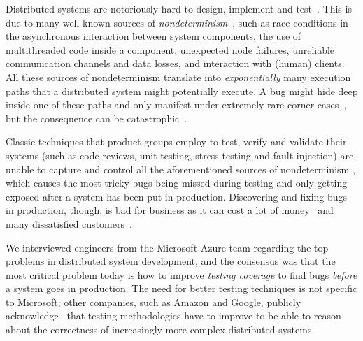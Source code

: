 Distributed systems are notoriously hard to design, implement and test~\cite{cavage2013there, laguna2015debugging, maddox2015test}. This is due to many well-known sources of \emph{nondeterminism}~\cite{chandra2007paxos}, such as race conditions in the asynchronous interaction between system components, the use of multithreaded code inside a component, unexpected node failures, unreliable communication channels and data losses, and interaction with (human) clients.
%
All these sources of nondeterminism translate into \emph{exponentially} many execution paths that a distributed system might potentially execute. A bug might hide deep inside one of these paths and only manifest under extremely rare corner cases~\cite{gray1986computers, musuvathi2008finding}, but the consequence can be catastrophic~\cite{amazon2012aws, google2014outage}.

Classic techniques that product groups employ to test, verify and validate their systems (such as code reviews, unit testing, stress testing and fault injection) are unable to capture and control all the aforementioned sources of nondeterminism  , which causes the most tricky bugs being missed during testing and only getting exposed after a system has been put in production. Discovering and fixing bugs in production, though, is bad for business as it can cost a lot of money~\cite{tassey2002economic} and many dissatisfied customers~\cite{amazon2012aws, google2014outage}.

We interviewed engineers from the Microsoft Azure team regarding the top problems in distributed system development, and the consensus was that the most critical problem today is how to improve \emph{testing coverage} to find bugs \emph{before} a system goes in production. The need for better testing techniques is not specific to Microsoft; other companies, such as Amazon and Google, publicly acknowledge~\cite{newcombe2015aws} that testing methodologies have to improve to be able to reason about the correctness of increasingly more complex distributed systems. 

